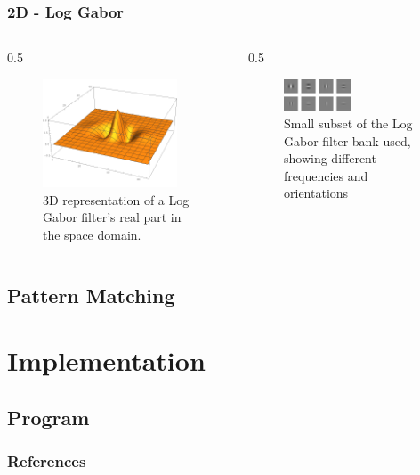 \documentclass{beamer}
\begin{document}
\begin{frame}
	[fragile] \frametitle{2D - Log Gabor}
	
	\begin{columns}
		\begin{column}
			{0.5
			\textwidth} 
			\begin{figure}[H]
			\centering
			  \includegraphics[width=0.89\textwidth]{../report/iris/log_gabor_2d.png}
				\caption{3D representation of a Log Gabor filter's real part in the space domain.}
				\label{fig:2Dloggabor}
			\end{figure}
		\end{column}
		\begin{column}
			{0.5
			\textwidth} 
			\begin{figure}[t]
				\centering
			  \includegraphics[width=0.49\textwidth]{../report/iris/2d_log_gabor_filter.png}
				\caption{Small subset of the Log Gabor filter bank used, showing different frequencies and orientations}
				\label{fig:filter_bank}
			\end{figure}
		\end{column}
	\end{columns}
	
\end{frame}

\subsection{Pattern Matching} 


\section{Implementation} 
\subsection{Program} 
\begin{frame}
\end{frame}
\begin{frame}
	[allowframebreaks] \frametitle{References} 
	 
	 
\end{frame}
\end{document}
